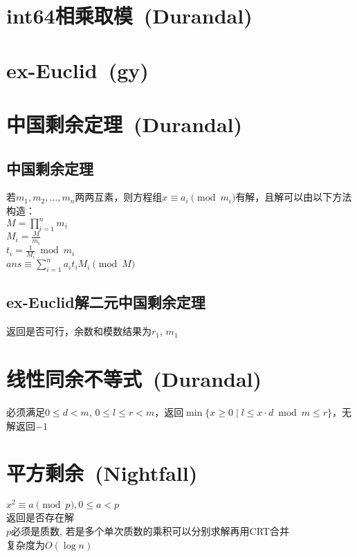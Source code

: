 \section{int64相乘取模\ \small(Durandal)}

\section{ex-Euclid\ \small(gy)}

\section{中国剩余定理\ \small(Durandal)}
    \subsection*{中国剩余定理}
        若$ m_1, m_2, \dots, m_n $两两互素，则方程组$ x \equiv a_i \pmod{m_i} $有解，且解可以由以下方法构造：
        \\$ M = \prod\limits_{i = 1}^{n} m_i $
        \\$ M_i = \frac{M}{m_i} $
        \\$ t_i = \frac{1}{M_i} \bmod m_i $
        \\$ ans \equiv \sum\limits_{i = 1}^{n} a_i t_i M_i \pmod M $
    \subsection*{ex-Euclid解二元中国剩余定理}
        返回是否可行，余数和模数结果为$ r_1 $, $ m_1 $

\section{线性同余不等式\ \small(Durandal)}
    必须满足$ 0 \leq d < m $, $ 0 \leq l \leq r < m $，返回$ \min\lbrace x \geq 0 \mid l \leq x \cdot d \bmod m \leq r \rbrace $，无解返回$ -1 $ 

\section{平方剩余\ \small(Nightfall)}
    $ x^2 \equiv a \pmod p, 0 \leq a < p $
    \\返回是否存在解
    \\$ p $必须是质数, 若是多个单次质数的乘积可以分别求解再用CRT合并
    \\复杂度为$ O(\log n) $

